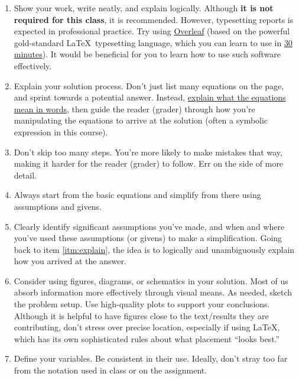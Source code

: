 \documentclass[11pt]{article}
\begin{document}
\begin{enumerate}

	\item Show your work, write neatly, and explain logically. Although \textbf{it is not required for this class}, it is recommended. However, typesetting reports is expected in professional practice. Try using \href{https://www.overleaf.com/edu/purdue}{Overleaf} (based on the powerful gold-standard \LaTeX\ typesetting language, which you can learn to use in \href{https://www.overleaf.com/learn/latex/Learn_LaTeX_in_30_minutes}{30 minutes}). It would be beneficial for you to learn how to use such software effectively.

	\item\label{itm:explain} Explain your solution process. Don't just list many equations on the page, and sprint towards a potential answer. Instead, \href{https://pubs.aip.org/asa/poma/article/54/1/025002/3352466/Helping-students-learn-to-read-mathematical}{explain what the equations mean in words}, then guide the reader (grader) through how you're manipulating the equations to arrive at the solution (often a symbolic expression in this course).

	\item Don't skip too many steps. You're more likely to make mistakes that way, making it harder for the reader (grader) to follow. Err on the side of more detail.

	\item Always start from the basic equations and simplify from there using assumptions and givens.

	\item Clearly identify significant assumptions you've made, and when and where you've used these assumptions (or givens) to make a simplification. Going back to item \ref{itm:explain}, the idea is to logically and unambiguously explain how you arrived at the answer.

	\item Consider using figures, diagrams, or schematics in your solution. Most of us absorb information more effectively through visual means. As needed, sketch the problem setup. Use high-quality plots to support your conclusions. Although it is helpful to have figures close to the text/results they are contributing, don't stress over precise location, especially if using \LaTeX, which has its own sophisticated rules about what placement ``looks best.''

	\item Define your variables. Be consistent in their use. Ideally, don't stray too far from the notation used in class or on the assignment.


\end{enumerate}
\end{document}
